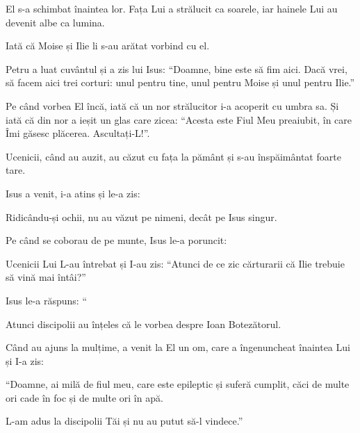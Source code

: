 {El s-a schimbat înaintea lor. Fața Lui a strălucit ca soarele, iar hainele Lui au devenit albe ca lumina.

Iată că Moise și Ilie li s-au arătat vorbind cu el.


\par }{\PP {}Petru a luat cuvântul și a zis lui Isus: “Doamne, bine este să fim aici. Dacă vrei, să facem aici trei corturi: unul pentru tine, unul pentru Moise și unul pentru Ilie.”


\par }{\PP {}Pe când vorbea El încă, iată că un nor strălucitor i-a acoperit cu umbra sa. Și iată că din nor a ieșit un glas care zicea: “Acesta este Fiul Meu preaiubit, în care Îmi găsesc plăcerea. Ascultați-L!”.


\par }{\PP {}Ucenicii, când au auzit, au căzut cu fața la pământ și s-au înspăimântat foarte tare.

Isus a venit, i-a atins și le-a zis:
{}

Ridicându-și ochii, nu au văzut pe nimeni, decât pe Isus singur.


\par }{\PP {}Pe când se coborau de pe munte, Isus le-a poruncit:
{}


\par }{\PP {}Ucenicii Lui L-au întrebat și I-au zis: “Atunci de ce zic cărturarii că Ilie trebuie să vină mai întâi?”


\par }{\PP {}Isus le-a răspuns: “{}


Atunci discipolii au înțeles că le vorbea despre Ioan Botezătorul.


\par }{\PP {}Când au ajuns la mulțime, a venit la El un om, care a îngenuncheat înaintea Lui și I-a zis:

“Doamne, ai milă de fiul meu, care este epileptic și suferă cumplit, căci de multe ori cade în foc și de multe ori în apă.

L-am adus la discipolii Tăi și nu au putut să-l vindece.”


}
